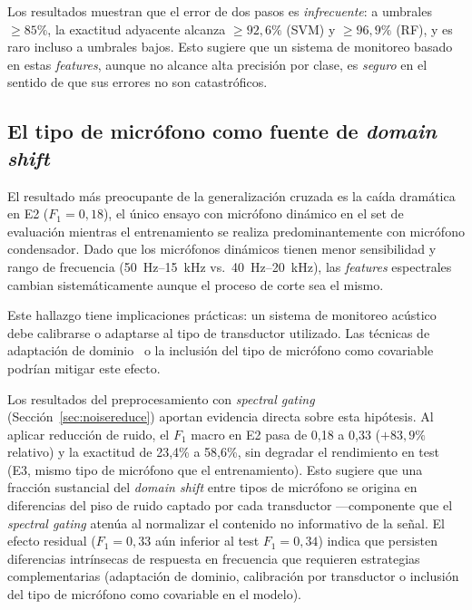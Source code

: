 \documentclass[10pt,twocolumn]{article}
\begin{document}
Los resultados muestran que el error de dos pasos es \textit{infrecuente}:
a umbrales $\geq 85\%$, la exactitud adyacente alcanza $\geq 92{,}6\%$
(SVM) y $\geq 96{,}9\%$ (RF), y es raro incluso a umbrales bajos. Esto
sugiere que un sistema de monitoreo basado en estas \textit{features},
aunque no alcance alta precisión por clase, es \textit{seguro} en el
sentido de que sus errores no son catastróficos.

\subsection{El tipo de micrófono como fuente de \textit{domain shift}}

El resultado más preocupante de la generalización cruzada es la caída
dramática en E2 ($F_1 = 0{,}18$), el único ensayo con micrófono dinámico
en el set de evaluación mientras el entrenamiento se realiza
predominantemente con micrófono condensador. Dado que los micrófonos
dinámicos tienen menor sensibilidad y rango de frecuencia
(50~Hz--15~kHz vs.\ 40~Hz--20~kHz), las \textit{features} espectrales
cambian sistemáticamente aunque el proceso de corte sea el mismo.

Este hallazgo tiene implicaciones prácticas: un sistema de monitoreo
acústico debe calibrarse o adaptarse al tipo de transductor utilizado.
Las técnicas de adaptación de dominio~\cite{banda2024} o la inclusión
del tipo de micrófono como covariable podrían mitigar este efecto.

Los resultados del preprocesamiento con \textit{spectral gating}
(Sección~\ref{sec:noisereduce}) aportan evidencia directa sobre esta
hipótesis. Al aplicar reducción de ruido, el $F_1$ macro en E2 pasa de
0{,}18 a 0{,}33 ($+83{,}9\%$ relativo) y la exactitud de 23{,}4\% a
58{,}6\%, sin degradar el rendimiento en test (E3, mismo tipo de
micrófono que el entrenamiento). Esto sugiere que una fracción
sustancial del \textit{domain shift} entre tipos de micrófono se
origina en diferencias del piso de ruido captado por cada transductor
---componente que el \textit{spectral gating} atenúa al normalizar el
contenido no informativo de la señal. El efecto residual ($F_1 = 0{,}33$
aún inferior al test $F_1 = 0{,}34$) indica que persisten diferencias
intrínsecas de respuesta en frecuencia que requieren estrategias
complementarias (adaptación de dominio, calibración por transductor o
inclusión del tipo de micrófono como covariable en el modelo).
\end{document}
